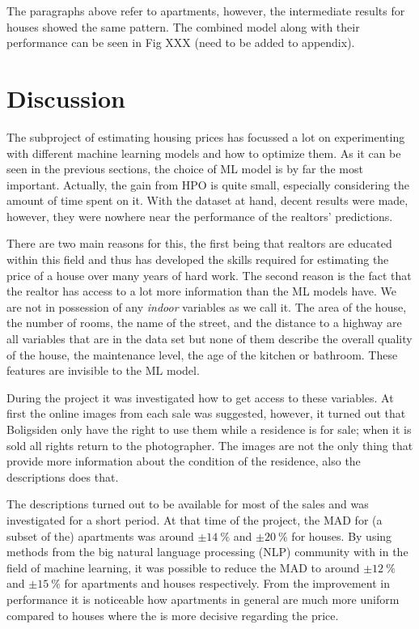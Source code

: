 The paragraphs above refer to apartments, however, the intermediate results for houses showed the same pattern. The combined model along with their performance can be seen in Fig XXX (need to be added to appendix). 

\section{Discussion}
\label{sec:h:discussion}

The subproject of estimating housing prices has focussed a lot on experimenting with different machine learning models and how to optimize them. As it can be seen in the previous sections, the choice of ML model is by far the most important. Actually, the gain from HPO is quite small, especially considering the amount of time spent on it. With the dataset at hand, decent results were made, however, they were nowhere near the performance of the realtors' predictions. 

There are two main reasons for this, the first being that realtors are educated within this field and thus has developed the skills required for estimating the price of a house over many years of hard work. The second reason is the fact that the realtor has access to a lot more information than the ML models have. We are not in possession of any \emph{indoor} variables as we call it. The area of the house, the number of rooms, the name of the street, and the distance to a highway are all variables that are in the data set but none of them describe the overall quality of the house, the maintenance level, the age of the kitchen or bathroom. These features are invisible to the ML model. 

During the project it was investigated how to get access to these variables. At first the online images from each sale was suggested, however, it turned out that Boligsiden only have the right to use them while a residence is for sale; when it is sold all rights return to the photographer. The images are not the only thing that provide more information about the condition of the residence, also the descriptions does that. 

The descriptions turned out to be available for most of the sales and was investigated for a short period. At that time of the project, the MAD for (a subset of the) apartments was around $\pm \SI{14}{\percent}$ and $\pm \SI{20}{\percent}$ for houses. By using methods from the big natural language processing (NLP) community with in the field of machine learning, it was possible to reduce the MAD to around $\pm \SI{12}{\percent}$ and $\pm \SI{15}{\percent}$ for apartments and houses respectively. From the improvement in performance it is noticeable how apartments in general are much more uniform compared to houses where the  is more decisive regarding the price. 

